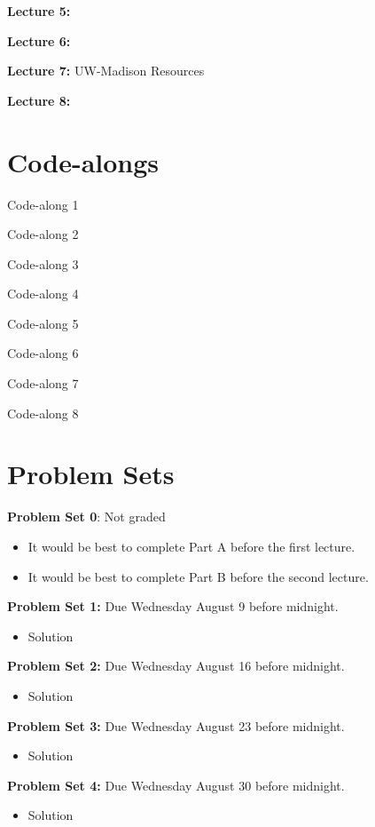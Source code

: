 \documentclass[
]{book}
\providecommand{\tightlist}{%
  \setlength{\itemsep}{0pt}\setlength{\parskip}{0pt}}
\begin{document}
\textbf{Lecture 5:}

\textbf{Lecture 6:}

\textbf{Lecture 7:} UW-Madison Resources

\textbf{Lecture 8:}

\hypertarget{code-alongs}{%
\chapter{Code-alongs}\label{code-alongs}}

Code-along 1

Code-along 2

Code-along 3

Code-along 4

Code-along 5

Code-along 6

Code-along 7

Code-along 8

\hypertarget{problem-sets}{%
\chapter{Problem Sets}\label{problem-sets}}

\textbf{Problem Set 0}: Not graded

\begin{itemize}
\tightlist
\item
  It would be best to complete Part A before the first lecture.
\item
  It would be best to complete Part B before the second lecture.
\end{itemize}

\textbf{Problem Set 1:} Due Wednesday August 9 before midnight.

\begin{itemize}
\tightlist
\item
  Solution
\end{itemize}

\textbf{Problem Set 2:} Due Wednesday August 16 before midnight.

\begin{itemize}
\tightlist
\item
  Solution
\end{itemize}

\textbf{Problem Set 3:} Due Wednesday August 23 before midnight.

\begin{itemize}
\tightlist
\item
  Solution
\end{itemize}

\textbf{Problem Set 4:} Due Wednesday August 30 before midnight.

\begin{itemize}
\tightlist
\item
  Solution
\end{itemize}

  
\end{document}
